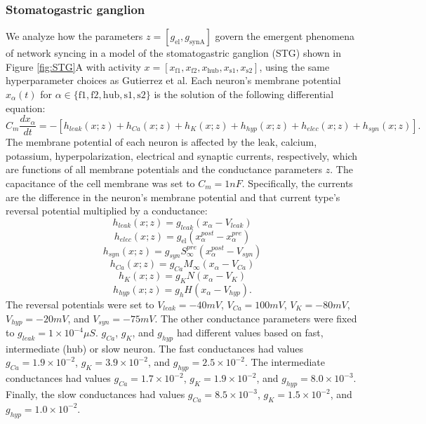 \documentclass[11pt]{article}
\begin{document}
\subsubsection{Stomatogastric ganglion}\label{methods_STG}
We analyze how the parameters $z = [ g_{\text{el}}, g_{\text{synA}}]$ govern the emergent phenomena of network syncing in a model of the stomatogastric ganglion (STG) \cite{gutierrez2013multiple} shown in Figure \ref{fig:STG}A with activity $x = \left[ x_{\text{f1}}, x_{\text{f2}}, x_{\text{hub}}, x_{\text{s1}}, x_{\text{s2}} \right]$, using the same hyperparameter choices as Gutierrez et al.
Each neuron's membrane potential $x_\alpha(t)$ for $\alpha \in \{ \text{f1}, \text{f2}, \text{hub}, \text{s1}, \text{s2} \}$ is the solution of the following differential equation:
\begin{equation} C_m \frac{dx_\alpha}{dt} = - \left[ h_{leak}(x; z) + h_{Ca}(x; z) + h_K(x; z) + h_{hyp}(x; z) + h_{elec}(x; z) + h_{syn}(x; z)\right].
\end{equation} 
The membrane potential of each neuron is affected by the leak, calcium, potassium, hyperpolarization,
electrical and synaptic currents, respectively, which are functions of  all membrane potentials and the conductance parameters $z$.  
The capacitance of the cell membrane was set to $C_m = 1nF$. Specifically, the currents are the difference in the neuron's membrane potential and that current type's reversal potential multiplied by a conductance:
\begin{equation}  h_{leak}(x; z) = g_{leak} (x_\alpha - V_{leak}) 
\end{equation} 
\begin{equation}  h_{elec}(x; z) = g_{\text{el}} (x_\alpha^{post} - x_\alpha^{pre})
\end{equation} 
\begin{equation}  h_{syn}(x; z) = g_{syn} S_\infty^{pre} (x_\alpha^{post} - V_{syn}) \end{equation} 
\begin{equation}  h_{Ca}(x; z) = g_{Ca} M_\infty (x_\alpha - V_{Ca}) 
\end{equation} 
\begin{equation}  h_K(x; z) = g_K N (x_\alpha - V_K) 
\end{equation} 
\begin{equation}  h_{hyp}(x; z) = g_h H(x_\alpha - V_{hyp}).
\end{equation} 
The reversal potentials were set to $V_{leak} = -40mV$, $V_{Ca} = 100mV$, $V_K = -80mV$, $V_{hyp} = -20mV$, and $V_{syn} = -75mV$.  The other conductance parameters were fixed to $g_{leak} = 1 \times 10^{-4} \mu S$. $g_{Ca}$, $g_{K}$, and $g_{hyp}$ had different values based on fast, intermediate (hub) or slow neuron.  The fast conductances had values $g_{Ca} = 1.9 \times 10^{-2}$, $ g_K = 3.9 \times 10^{-2} $, and $ g_{hyp} = 2.5 \times 10^{-2} $.  The intermediate conductances had values $g_{Ca} = 1.7 \times 10^{-2}$, $ g_K = 1.9 \times 10^{-2} $, and $ g_{hyp} = 8.0 \times 10^{-3} $.  Finally, the slow conductances had values $g_{Ca} = 8.5 \times 10^{-3}$, $ g_K = 1.5 \times 10^{-2} $, and $ g_{hyp} = 1.0 \times 10^{-2} $.
\end{document}

